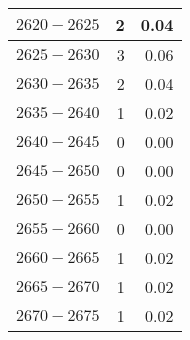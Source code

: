 \begin{longtable}{|l|r|r|}
		{\color[HTML]{000000} $ 2620 - 2625 $} & {\color[HTML]{000000} 2}                                                      & {\color[HTML]{000000} 0.04}                                                     \\ \hline
		{\color[HTML]{000000} $ 2625 - 2630 $} & {\color[HTML]{000000} 3}                                                      & {\color[HTML]{000000} 0.06}                                                     \\ \hline
		{\color[HTML]{000000} $ 2630 - 2635 $} & {\color[HTML]{000000} 2}                                                      & {\color[HTML]{000000} 0.04}                                                     \\ \hline
		{\color[HTML]{000000} $ 2635 - 2640 $} & {\color[HTML]{000000} 1}                                                      & {\color[HTML]{000000} 0.02}                                                     \\ \hline
		{\color[HTML]{000000} $ 2640 - 2645 $} & {\color[HTML]{000000} 0}                                                      & {\color[HTML]{000000} 0.00}                                                     \\ \hline
		{\color[HTML]{000000} $ 2645 - 2650 $} & {\color[HTML]{000000} 0}                                                      & {\color[HTML]{000000} 0.00}                                                     \\ \hline
		{\color[HTML]{000000} $ 2650 - 2655 $} & {\color[HTML]{000000} 1}                                                      & {\color[HTML]{000000} 0.02}                                                     \\ \hline
		{\color[HTML]{000000} $ 2655 - 2660 $} & {\color[HTML]{000000} 0}                                                      & {\color[HTML]{000000} 0.00}                                                     \\ \hline
		{\color[HTML]{000000} $ 2660 - 2665 $} & {\color[HTML]{000000} 1}                                                      & {\color[HTML]{000000} 0.02}                                                     \\ \hline
		{\color[HTML]{000000} $ 2665 - 2670 $} & {\color[HTML]{000000} 1}                                                      & {\color[HTML]{000000} 0.02}                                                     \\ \hline
		{\color[HTML]{000000} $ 2670 - 2675 $} & {\color[HTML]{000000} 1}                                                      & {\color[HTML]{000000} 0.02}                                                     \\ \hline

\end{longtable}
